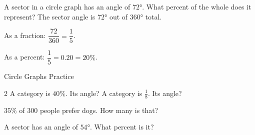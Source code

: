 \begin{stepExample}{A sector in a circle graph has an angle of $72°$. What percent of the whole does it represent?}
     The sector angle is $72°$ out of $360°$ total.

     As a fraction: $\dfrac{72}{360} = \dfrac{1}{5}$.

     As a percent: $\dfrac{1}{5} = 0.20 = 20\%$.
\end{stepExample}


\newpage
\begin{stepPractice}{Circle Graphs Practice}
    \resetProblems

    \begin{multicols}{2}
    \prob A category is $40\%$. Its angle? \answerBlank[2cm]
    \prob A category is $\frac{1}{8}$. Its angle? \answerBlank[2cm]
    \end{multicols}

    \prob $35\%$ of $300$ people prefer dogs. How many is that? \answerBlank[2.5cm]

    \prob A sector has an angle of $54°$. What percent is it? \answerBlank[2.5cm]

\end{stepPractice}
